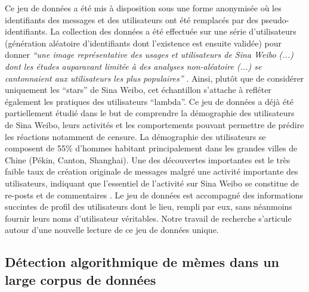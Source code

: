 Ce jeu de données a été mis à disposition sous une forme anonymisée o\`u les identifiants des messages et des utilisateurs ont été remplacés par des pseudo-identifiants. La collection des données a été effectuée sur une série d{\textquoteright}utilisateurs (génération aléatoire d{\textquoteright}identifiants dont l{\textquoteright}existence est ensuite validée) pour donner \textit{{\textquotedblleft}une image représentative des usages et utilisateurs de Sina Weibo (...) dont les études auparavant limitée à des analyses non-aléatoire (...) se cantonnaient aux utilisateurs les plus populaires{\textquotedblright} }\citep{Fu2013}. Ainsi, plut\^ot que de considérer uniquement les {\textquotedblleft}stars{\textquotedblright} de Sina Weibo, cet échantillon s{\textquoteright}attache à refléter également les pratiques des utilisateurs {\textquotedblleft}lambda{\textquotedblright}. Ce jeu de données a déjà été partiellement étudié dans le but de comprendre la démographie des utilisateurs de Sina Weibo, leurs activités et les comportements pouvant permettre de prédire les réactions notamment de censure. La démographie des utilisateurs se composent de 55\% d{\textquoteright}hommes habitant principalement dans les grandes villes de Chine (Pékin, Canton, Shanghai). Une des découvertes importantes est le très faible taux de création originale de messages malgré une activité importante des utilisateurs, indiquant que l{\textquoteright}essentiel de l{\textquoteright}activité sur Sina Weibo se constitue de re-posts et de commentaires \citep{Fu2013}. Le jeu de données est accompagné des informations succintes de profil des utilisateurs dont le lieu, rempli par eux, sans néanmoins fournir leurs noms d{\textquoteright}utilisateur véritables. Notre travail de recherche s{\textquoteright}articule autour d{\textquoteright}une nouvelle lecture de ce jeu de données unique.

\subsection[Détection algorithmique de mèmes]{Détection algorithmique de mèmes dans un large corpus de données}

